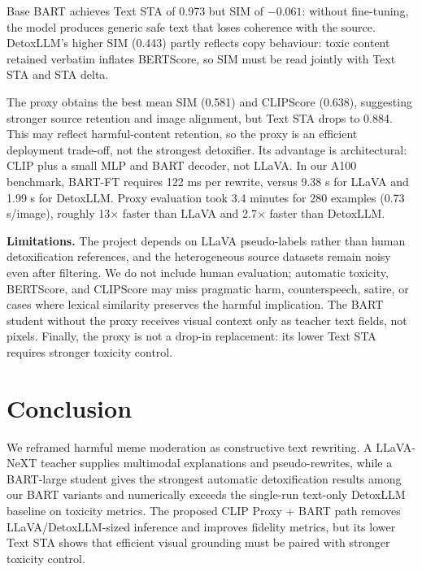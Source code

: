 \documentclass{article}
\newcommand{\sta}{\textsc{STA}}
\begin{document}
Base BART achieves Text \sta{} of 0.973 but SIM of $-0.061$: without fine-tuning, the model
produces generic safe text that loses coherence with the source. DetoxLLM's higher SIM (0.443) partly reflects copy behaviour: toxic content retained verbatim inflates BERTScore, so SIM must be read jointly with Text \sta{} and \sta{} delta.

The proxy obtains the best mean SIM (0.581) and CLIPScore (0.638), suggesting
stronger source retention and image alignment, but Text \sta{} drops to 0.884.
This may reflect harmful-content retention, so the proxy is an efficient
deployment trade-off, not the strongest detoxifier. Its advantage is
architectural: CLIP plus a small MLP and BART decoder, not LLaVA. In our A100
benchmark, BART-FT requires 122 ms per rewrite, versus 9.38 s for LLaVA and
1.99 s for DetoxLLM. Proxy evaluation took 3.4 minutes for 280 examples
(0.73 s/image), roughly 13$\times$ faster than LLaVA and 2.7$\times$ faster than
DetoxLLM.

\vspace{0.05em}
\noindent\textbf{Limitations.} The project depends on LLaVA pseudo-labels rather than
human detoxification references, and the heterogeneous source datasets remain
noisy even after filtering. We do not include human evaluation; automatic
toxicity, BERTScore, and CLIPScore may miss pragmatic harm, counterspeech,
satire, or cases where lexical similarity preserves the harmful implication.
The BART student without the proxy receives visual context only as teacher text
fields, not pixels. Finally, the proxy is not a drop-in replacement: its lower
Text \sta{} requires stronger toxicity control.

\section{Conclusion}
\label{sec:conclusion}

We reframed harmful meme moderation as constructive text rewriting. A LLaVA-NeXT
teacher supplies multimodal explanations and pseudo-rewrites, while a BART-large student gives the strongest automatic detoxification
results among our BART variants and numerically exceeds the single-run text-only
DetoxLLM baseline on toxicity metrics. The proposed CLIP Proxy + BART path
removes LLaVA/DetoxLLM-sized inference and improves fidelity metrics, but its
lower Text \sta{} shows that efficient visual grounding must be paired with
stronger toxicity control.

\renewcommand{\bibfont}{\fontsize{9.355}{10.5}\selectfont}
\setlength{\bibsep}{0pt}


\end{document}
